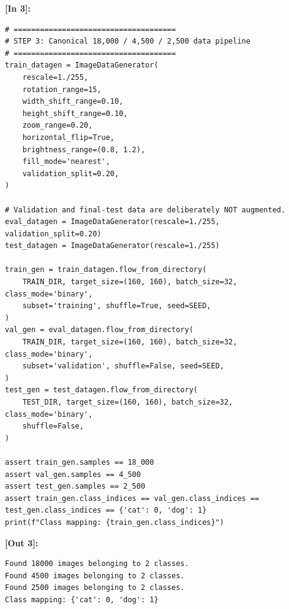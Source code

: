 \vspace{0.6em}
\noindent\textbf{\small [In 3]:}
\begin{lstlisting}[style=pycode]
# =====================================
# STEP 3: Canonical 18,000 / 4,500 / 2,500 data pipeline
# =====================================
train_datagen = ImageDataGenerator(
    rescale=1./255,
    rotation_range=15,
    width_shift_range=0.10,
    height_shift_range=0.10,
    zoom_range=0.20,
    horizontal_flip=True,
    brightness_range=(0.8, 1.2),
    fill_mode='nearest',
    validation_split=0.20,
)

# Validation and final-test data are deliberately NOT augmented.
eval_datagen = ImageDataGenerator(rescale=1./255, validation_split=0.20)
test_datagen = ImageDataGenerator(rescale=1./255)

train_gen = train_datagen.flow_from_directory(
    TRAIN_DIR, target_size=(160, 160), batch_size=32, class_mode='binary',
    subset='training', shuffle=True, seed=SEED,
)
val_gen = eval_datagen.flow_from_directory(
    TRAIN_DIR, target_size=(160, 160), batch_size=32, class_mode='binary',
    subset='validation', shuffle=False, seed=SEED,
)
test_gen = test_datagen.flow_from_directory(
    TEST_DIR, target_size=(160, 160), batch_size=32, class_mode='binary',
    shuffle=False,
)

assert train_gen.samples == 18_000
assert val_gen.samples == 4_500
assert test_gen.samples == 2_500
assert train_gen.class_indices == val_gen.class_indices == test_gen.class_indices == {'cat': 0, 'dog': 1}
print(f"Class mapping: {train_gen.class_indices}")\end{lstlisting}
\noindent\textbf{\small [Out 3]:}
\begin{lstlisting}[style=output]
Found 18000 images belonging to 2 classes.
Found 4500 images belonging to 2 classes.
Found 2500 images belonging to 2 classes.
Class mapping: {'cat': 0, 'dog': 1}
\end{lstlisting}

